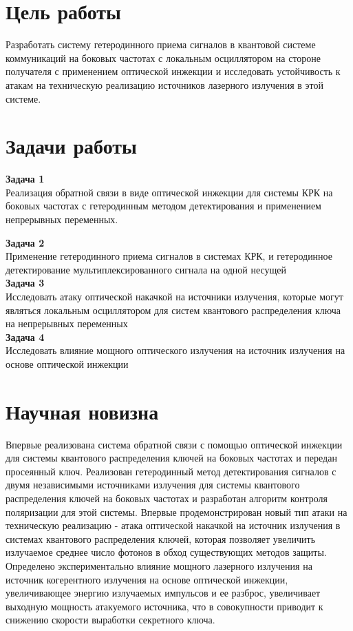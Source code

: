 \section*{Цель работы}
Разработать систему гетеродинного приема сигналов в квантовой системе коммуникаций на боковых частотах с локальным осциллятором на стороне получателя с применением оптической инжекции и исследовать устойчивость к атакам на техническую реализацию источников лазерного излучения в этой системе. 

\section*{Задачи работы}
\textbf{Задача 1}\\
Реализация обратной связи в виде оптической инжекции для системы КРК на боковых частотах с гетеродинным методом детектирования и применением непрерывных переменных. 

\textbf{Задача 2}\\
Применение гетеродинного приема сигналов в системах КРК, и гетеродинное детектирование мультиплексированного сигнала на одной несущей\\

\textbf{Задача 3}\\
Исследовать атаку оптической накачкой на источники излучения, которые могут являться локальным осциллятором для систем квантового распределения ключа на непрерывных переменных\\

\textbf{Задача 4}\\
Исследовать влияние мощного оптического излучения на источник излучения на основе оптической инжекции\\

\section*{Научная новизна}
Впервые реализована система обратной связи с помощью оптической инжекции для системы квантового распределения ключей на боковых частотах и передан просеянный ключ. Реализован гетеродинный метод детектирования сигналов с двумя независимыми источниками излучения для системы квантового распределения ключей на боковых частотах и разработан алгоритм контроля поляризации для этой системы. Впервые продемонстрирован новый тип атаки на техническую реализацию - атака оптической накачкой на источник излучения в системах квантового распределения ключей, которая позволяет увеличить излучаемое среднее число фотонов в обход существующих методов защиты. Определено экспериментально влияние мощного лазерного излучения на источник когерентного излучения на основе оптической инжекции, увеличивающее энергию излучаемых импульсов и ее разброс, увеличивает выходную мощность атакуемого источника, что в совокупности приводит к снижению скорости выработки секретного ключа.
